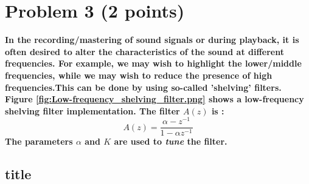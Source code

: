 \section{Problem 3 (2 points)}
\textbf{In the recording/mastering of sound signals or during playback, it is often desired to alter the characteristics of the sound at different frequencies. For example, we may wish to highlight the lower/middle frequencies, while we may wish to reduce the presence of high frequencies.This can be done by using so-called 'shelving' filters. Figure \ref{fig:Low-frequency_shelving_filter.png} shows a low-frequency shelving filter implementation. The filter \( A(z) \) is :
\[A(z)=\frac{\alpha-z^{-1}}{1-\alpha z^{-1}}\]
The parameters \( \alpha \) and \( K \) are used to \textit{tune} the filter.}


\subsection*{title}